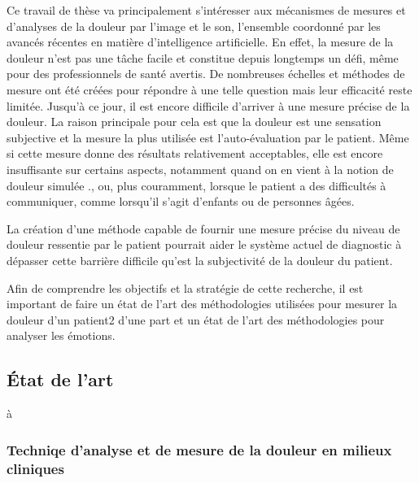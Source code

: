 \documentclass[french]{article}
\begin{document}
Ce travail de thèse va principalement s’intéresser aux mécanismes de mesures et
d’analyses de la douleur par l’image et le son, l’ensemble coordonné par les
avancés récentes en matière d'intelligence artificielle. En effet, la mesure
de la douleur n’est pas une tâche facile et constitue depuis longtemps un défi,
même pour des professionnels de santé avertis. De nombreuses échelles et
méthodes de mesure ont été créées pour répondre à une telle question
\cite{wong1996wong,mccaffery1999pain,portenoy1996visual,melzack1975mcgill,galer1997development,gracely1988descriptor}
mais leur efficacité reste limitée. Jusqu’à ce jour, il est encore difficile d’arriver à une mesure précise
de la douleur. La raison principale pour cela est que la douleur est une
sensation subjective et la mesure la plus utilisée est l’auto-évaluation par le
patient. Même si cette mesure donne des résultats relativement acceptables, elle
est encore insuffisante sur certains aspects, notamment quand on en vient à la
notion de douleur simulée \cite{lucey2011automatically}., ou, plus couramment, lorsque le patient a des
difficultés à communiquer, comme lorsqu’il s’agit d’enfants ou de personnes
âgées.


La création  d’une méthode capable  de fournir une  mesure précise du  niveau de
douleur ressentie par le patient pourrait  aider le système actuel de diagnostic
à dépasser  cette barrière  difficile qu'est  la subjectivité  de la  douleur du
patient.

Afin de comprendre les objectifs et la stratégie de cette recherche, il est
important de faire un état de l’art des méthodologies utilisées pour mesurer la
douleur d’un patient2 d’une part et un état de l’art des méthodologies pour analyser les émotions.

\subsection{État de l’art}
\label{sec:org8119c98}
à
\subsubsection{Techniqe d'analyse et de mesure de la douleur en milieux
  cliniques}
\end{document}
